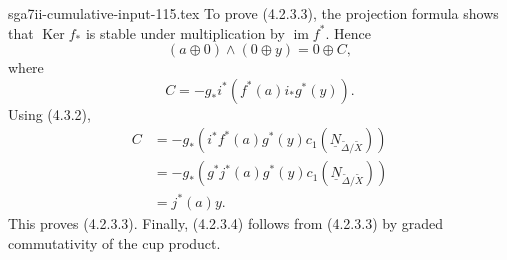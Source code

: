 \begin{filecontents*}{sga7ii-cumulative-input-115.tex}
To prove (4.2.3.3), the projection formula shows that
$\operatorname{Ker}f_*$ is stable under multiplication by
$\operatorname{im}f^*$.  Hence
\[
(a\oplus0)\wedge(0\oplus y)=0\oplus C,
\]
where
\begin{equation}\tag{4.3.3}
C=-g_*i^*\!\left(f^*(a)i_*g^*(y)\right).
\end{equation}
Using (4.3.2),
\[
\begin{aligned}
C
&=-g_*\!\left(i^*f^*(a)g^*(y)
      c_1(\underline N_{\widetilde\Delta/\widetilde X})\right)\\
&=-g_*\!\left(g^*j^*(a)g^*(y)
      c_1(\underline N_{\widetilde\Delta/\widetilde X})\right)\\
&=j^*(a)y.
\end{aligned}
\]
This proves (4.2.3.3).  Finally, (4.2.3.4) follows from (4.2.3.3) by graded
commutativity of the cup product.
\end{filecontents*}
